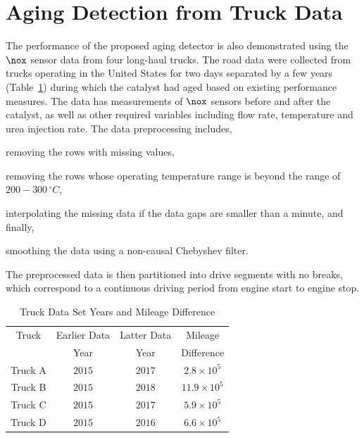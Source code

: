\section{Aging Detection from Truck Data}
The performance of the proposed aging detector is also demonstrated using the $\nox$ sensor data from four long-haul
trucks. The road data were collected from trucks operating in the United States for two days separated by a few years
(Table~\ref{tab::truck_data_summary}) during which the catalyst had aged based on existing performance measures. The
data has measurements of $\nox$ sensors before and after the catalyst, as well as other required variables
including flow rate, temperature and urea injection rate. The data preprocessing includes,
\begin{inparaenum}
        \item removing the rows with missing values,
        \item removing the rows whose operating temperature range is beyond the range of $200-300 \,^\circ C$,
        \item interpolating the missing data if the data gaps are smaller than a minute, and finally,
        \item smoothing the data using a non-causal Chebyshev filter.
\end{inparaenum}
The preprocessed data is then partitioned into drive segments with no breaks, which correspond to a continuous driving
period from engine start to engine stop.
\begin{table}[ht]
        \centering
        \caption{Truck Data Set Years and Mileage Difference}
        \label{tab::truck_data_summary}
        \begin{tabular}{c c c c}
                \hline \hline
                Truck   & Earlier Data & Latter Data & Mileage            \\
                        & Year         & Year        & Difference         \\ \hline \hline
                Truck A & $2015$       & $2017$      & $2.8 \times 10^5$  \\
                Truck B & $2015$       & $2018$      & $11.9 \times 10^5$ \\
                Truck C & $2015$       & $2017$      & $5.9 \times 10^5$  \\
                Truck D & $2015$       & $2016$      & $6.6 \times 10^5$  \\
                \hline \hline
        \end{tabular}
\end{table}
